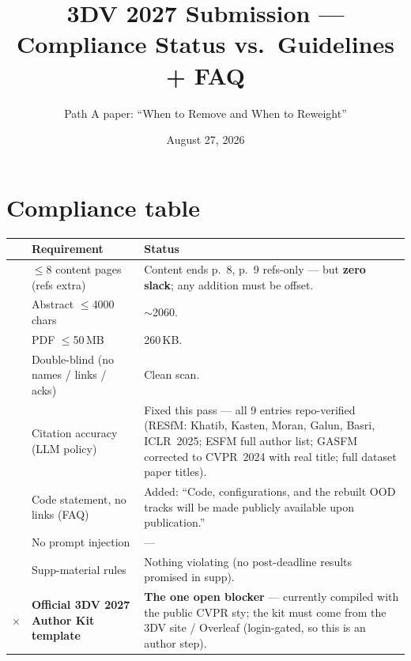 \documentclass[11pt]{article}
\title{3DV 2027 Submission --- Compliance Status vs.\ Guidelines + FAQ}
\author{Path A paper: ``When to Remove and When to Reweight''}
\date{August 27, 2026}
\newcommand{\ok}{\textcolor{green!55!black}{\checkmark}}
\newcommand{\bad}{\textcolor{red!75!black}{$\times$}}
\begin{document}
\maketitle

\section*{Compliance table}
\renewcommand{\arraystretch}{1.35}
\noindent\begin{tabular}{@{}c p{4.6cm} p{9.2cm}@{}}
\toprule
 & \textbf{Requirement} & \textbf{Status}\\
\midrule
\ok & $\le$8 content pages (refs extra) & Content ends p.~8, p.~9 refs-only --- but \textbf{zero slack}; any addition must be offset.\\
\ok & Abstract $\le$4000 chars & $\sim$2060.\\
\ok & PDF $\le$50\,MB & 260\,KB.\\
\ok & Double-blind (no names / links / acks) & Clean scan.\\
\ok & Citation accuracy (LLM policy) & Fixed this pass --- all 9 entries repo-verified (RESfM: Khatib, Kasten, Moran, Galun, Basri, ICLR~2025; ESFM full author list; GASFM corrected to CVPR~2024 with real title; full dataset paper titles).\\
\ok & Code statement, no links (FAQ) & Added: ``Code, configurations, and the rebuilt OOD tracks will be made publicly available upon publication.''\\
\ok & No prompt injection & --- \\
\ok & Supp-material rules & Nothing violating (no post-deadline results promised in supp).\\
\bad & \textbf{Official 3DV 2027 Author Kit template} & \textbf{The one open blocker} --- currently compiled with the public CVPR sty; the kit must come from the 3DV site / Overleaf (login-gated, so this is an author step).\\
\bottomrule
\end{tabular}
\end{document}
